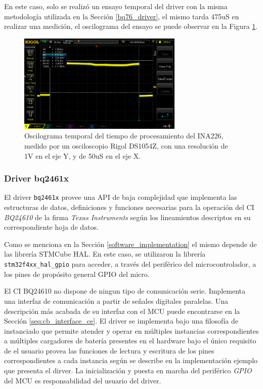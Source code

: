 \documentclass[10pt, a4paper]{report}
\begin{document}
En este caso, solo se realiz\'o un ensayo temporal del driver con la misma
metodolog\'ia utilizada en la Secci\'on \ref{bq76_driver}, el mismo tarda 475uS
en realizar una medici\'on, el oscilograma del ensayo se puede observar en la
Figura \ref{ina226_time}.

\begin{figure}[h!]
    \begin{center}
        \includegraphics[width=0.7\textwidth]{ina226_time.png}
        \caption{Oscilograma temporal del tiempo de procesamiento del INA226,
        medido por un osciloscopio Rigol DS1054Z, con una resoluci\'on de 1V en
        el eje Y, y de 50uS en el eje X.}
        \label{ina226_time}
    \end{center}
\end{figure}
\FloatBarrier

\subsubsection{Driver bq2461x}

El driver \texttt{bq2461x} provee una \acrshort{API} de baja complejidad que
implementa las estructuras de datos, definiciones y funciones necesarias para la
operación del \acrshort{CI} \emph{BQ24610} de la firma \emph{Texas
Instruments} según los lineamientos descriptos en su correspondiente hoja de
datos. 

Como se menciona en la Secci\'on \ref{software_implementation} el mismo
depende de las librer\'ia STMCube \acrshort{HAL}.
En este caso, se utilizaron la librer\'ia \texttt{stm32f4xx\_hal\_gpio} para
acceder, a través del periférico del microcontrolador, a los pines de propósito
general GPIO del micro.

El \acrshort{CI} BQ24610 no dispone de ningun tipo de comunicación serie.
Implementa una interfaz de comunicación a partir de señales digitales paralelas.
Una descripción más acabada de su interfaz con el \acrshort{MCU} puede
encontrarse en la Sección \ref{seq:cb_interface_ce}. El driver se implementa
bajo una filosofía de instanciado que permite atender y operar en múltiples
instancias correspondientes a múltiples cargadores de batería presentes en el
hardware bajo el único requisito de el usuario provea las funciones de lectura y
escritura de los pines correspondientes a cada instancia según se describe en la
implementación ejemplo que presenta el dirver. La inicialización y puesta en
marcha del periférico \emph{GPIO} del \acrshort{MCU} es responsabilidad del
usuario del driver.
\end{document}
